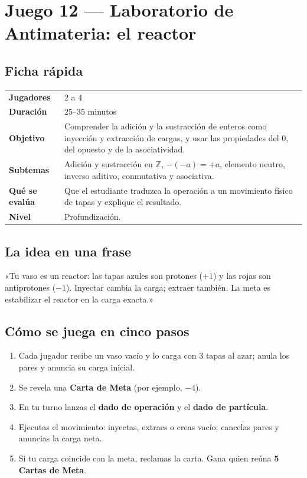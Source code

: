 \documentclass[12pt, letterpaper]{article}
\newcommand{\Z}{\mathbb{Z}}
\begin{document}
\clearpage
\section{Juego 12 — Laboratorio de Antimateria: el reactor}

\subsection{Ficha rápida}

\begin{center}
\small
\begin{tabular}{@{}p{3cm} p{12.2cm}@{}}
\toprule
\textbf{Jugadores} & 2 a 4\\
\textbf{Duración} & 25--35 minutos\\
\textbf{Objetivo} & Comprender la adición y la sustracción de enteros como inyección y extracción de cargas, y usar las propiedades del $0$, del opuesto y de la asociatividad.\\
\textbf{Subtemas} & Adición y sustracción en $\Z$, $-(-a)=+a$, elemento neutro, inverso aditivo, conmutativa y asociativa.\\
\textbf{Qué se evalúa} & Que el estudiante traduzca la operación a un movimiento físico de tapas y explique el resultado.\\
\textbf{Nivel} & Profundización.\\
\bottomrule
\end{tabular}
\end{center}

\subsection{La idea en una frase}

\begin{cuadroextra}
  «Tu vaso es un reactor: las tapas azules son protones ($+1$) y las rojas son antiprotones ($-1$). Inyectar cambia la carga; extraer también. La meta es estabilizar el reactor en la carga exacta.»
\end{cuadroextra}

\subsection{Cómo se juega en cinco pasos}

\begin{enumerate}[leftmargin=*]
  \item Cada jugador recibe un vaso vacío y lo carga con 3 tapas al azar; anula los pares y anuncia su carga inicial.
  \item Se revela una \textbf{Carta de Meta} (por ejemplo, $-4$).
  \item En tu turno lanzas el \textbf{dado de operación} y el \textbf{dado de partícula}.
  \item Ejecutas el movimiento: inyectas, extraes o creas vacío; cancelas pares y anuncias la carga neta.
  \item Si tu carga coincide con la meta, reclamas la carta. Gana quien reúna \textbf{5 Cartas de Meta}.
\end{enumerate}
\end{document}
